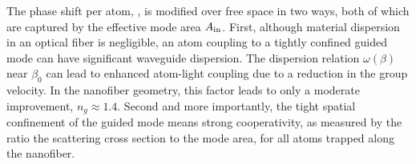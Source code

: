 \documentclass[preprint,aps,pra,onecolumn]{revtex4-1} %
\newcommand{\vac}{{\rm vac}}
\newcommand{\comment}[1]{{\color{Maroon} #1}}
\begin{document}
The phase shift per atom, , is modified over free space in two ways, both of which are captured by the effective mode area $A_{\rm in}$. First, although material dispersion in an optical fiber is negligible, an atom coupling to a tightly confined guided mode can have significant waveguide dispersion.  The dispersion relation $\omega(\beta)$ near $\beta_0$ can lead to enhanced atom-light coupling due to a reduction in the group velocity. In the nanofiber geometry, this factor leads to only a moderate improvement, \comment{ $n_g \approx 1.4$.} Second and more importantly,  the tight spatial confinement of the guided mode means strong cooperativity, as measured by the ratio the scattering cross section to the mode area, for all atoms trapped along the nanofiber.
\end{document}

